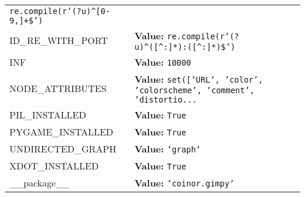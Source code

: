 \begin{longtable}{|p{\varnamewidth}|p{\vardescrwidth}|l}
{\tt re.compile(r'\texttt{(?u)}{\textasciicircum}\texttt{[}0\texttt{-}9,\texttt{]}\texttt{+}\$')}&\\
\cline{1-2}
\raggedright I\-D\-\_\-R\-E\-\_\-W\-I\-T\-H\-\_\-P\-O\-R\-T\- & \raggedright \textbf{Value:} 
{\tt re.compile(r'\texttt{(?u)}{\textasciicircum}\texttt{(}\texttt{[{\textasciicircum}}:\texttt{]}\texttt{*}\texttt{)}:\texttt{(}\texttt{[{\textasciicircum}}:\texttt{]}\texttt{*}\texttt{)}\$')}&\\
\cline{1-2}
\raggedright I\-N\-F\- & \raggedright \textbf{Value:} 
{\tt 10000}&\\
\cline{1-2}
\raggedright N\-O\-D\-E\-\_\-A\-T\-T\-R\-I\-B\-U\-T\-E\-S\- & \raggedright \textbf{Value:} 
{\tt \texttt{set([}\texttt{'}\texttt{URL}\texttt{'}\texttt{, }\texttt{'}\texttt{color}\texttt{'}\texttt{, }\texttt{'}\texttt{colorscheme}\texttt{'}\texttt{, }\texttt{'}\texttt{comment}\texttt{'}\texttt{, }\texttt{'}\texttt{distortio}\texttt{...}}&\\
\cline{1-2}
\raggedright P\-I\-L\-\_\-I\-N\-S\-T\-A\-L\-L\-E\-D\- & \raggedright \textbf{Value:} 
{\tt True}&\\
\cline{1-2}
\raggedright P\-Y\-G\-A\-M\-E\-\_\-I\-N\-S\-T\-A\-L\-L\-E\-D\- & \raggedright \textbf{Value:} 
{\tt True}&\\
\cline{1-2}
\raggedright U\-N\-D\-I\-R\-E\-C\-T\-E\-D\-\_\-G\-R\-A\-P\-H\- & \raggedright \textbf{Value:} 
{\tt \texttt{'}\texttt{graph}\texttt{'}}&\\
\cline{1-2}
\raggedright X\-D\-O\-T\-\_\-I\-N\-S\-T\-A\-L\-L\-E\-D\- & \raggedright \textbf{Value:} 
{\tt True}&\\
\cline{1-2}
\raggedright \_\-\_\-p\-a\-c\-k\-a\-g\-e\-\_\-\_\- & \raggedright \textbf{Value:} 
{\tt \texttt{'}\texttt{coinor.gimpy}\texttt{'}}&\\
\cline{1-2}
\end{longtable}

